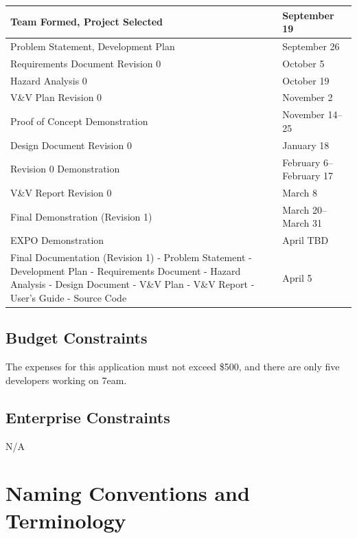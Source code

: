 \documentclass[12pt]{article}
\begin{document}
\begin{tabular}{ |p{9.7cm} l|}
	\hline
	Team Formed, Project Selected & September 19\\
	\hline
	Problem Statement, Development Plan & September 26\\
	\hline
	Requirements Document Revision 0 & October 5\\
	\hline
	Hazard Analysis 0 & October 19\\
	\hline
	V\&V Plan Revision 0 & November 2\\
	\hline
	Proof of Concept Demonstration & November 14--25\\
	\hline
	Design Document Revision 0 & January 18\\
	\hline
	Revision 0 Demonstration & February 6--February 17\\
	\hline
	V\&V Report Revision 0 & March 8\\
	\hline
	Final Demonstration (Revision 1) & March 20--March 31\\
	\hline
	EXPO Demonstration & April TBD\\
	\hline
	Final Documentation (Revision 1)\newline 
	- Problem Statement\newline
	- Development Plan\newline
	- Requirements Document\newline
	- Hazard Analysis\newline
	- Design Document\newline
	- V\&V Plan\newline
	- V\&V Report\newline
	- User's Guide\newline
	- Source Code\newline & April 5\\
	\hline
\end{tabular}

\subsection{Budget Constraints}
The expenses for this application must not exceed \$500, and there are only five developers working on 7eam.

\subsection{Enterprise Constraints}
N/A

\section{Naming Conventions and Terminology}
\end{document}
